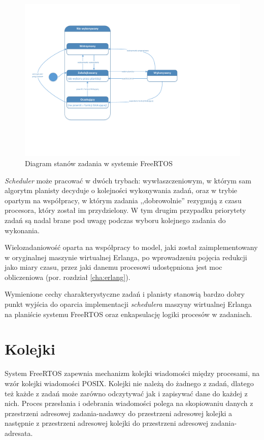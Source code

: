 \begin{figure}[h]
\centerline{\includegraphics[scale=0.7, clip, trim=0 40mm 75mm 20mm]{taskstate}}
\caption{Diagram stanów zadania w systemie FreeRTOS}
\label{fig:taskstate}
\end{figure}


\emph{Scheduler} może pracować w dwóch trybach: wywłaszczeniowym, w którym sam algorytm planisty decyduje o kolejności wykonywania zadań, oraz w trybie opartym na współpracy, w którym zadania ,,dobrowolnie'' rezygnują z czasu procesora, który został im przydzielony. W tym drugim przypadku priorytety zadań są nadal brane pod uwagę podczas wyboru kolejnego zadania do wykonania.

Wielozadaniowość oparta na współpracy to model, jaki został zaimplementowany w oryginalnej maszynie wirtualnej Erlanga, po wprowadzeniu pojęcia redukcji jako miary czasu, przez jaki danemu procesowi udostępniona jest moc obliczeniowa (por. rozdział \ref{cha:erlang}).

Wymienione cechy charakterystyczne zadań i planisty stanowią bardzo dobry punkt wyjścia do oparcia implementacji \emph{schedulera} maszyny wirtualnej Erlanga na planiście systemu FreeRTOS oraz enkapsulację logiki procesów w zadaniach.

\section{Kolejki}
\label{sec:rtosKolejki}

System FreeRTOS zapewnia mechanizm kolejki wiadomości między procesami, na wzór kolejki wiadomości POSIX. Kolejki nie należą do żadnego z zadań, dlatego też każde z zadań może zarówno odczytywać jak i zapisywać dane do każdej z nich. Proces przesłania i odebrania wiadomości polega na skopiowaniu danych z przestrzeni adresowej zadania-nadawcy do przestrzeni adresowej kolejki a następnie z przestrzeni adresowej kolejki do przestrzeni adresowej zadania-adresata.

